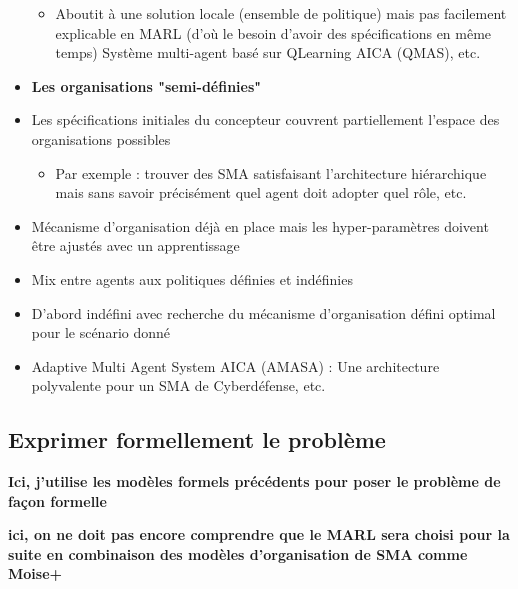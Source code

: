 \begin{itemize}
\begin{itemize}
              \item Aboutit à une solution locale (ensemble de politique) mais pas facilement explicable en MARL (d'où le besoin d'avoir des spécifications en même temps)
                    Système multi-agent basé sur QLearning AICA (QMAS), etc.
          \end{itemize}
    \item \textbf{Les organisations "semi-définies"}
    \item Les spécifications initiales du concepteur couvrent partiellement l'espace des organisations possibles
          \begin{itemize}
              \item Par exemple : trouver des SMA satisfaisant l'architecture hiérarchique mais sans savoir précisément quel agent doit adopter quel rôle, etc.
          \end{itemize}
    \item Mécanisme d'organisation déjà en place mais les hyper-paramètres doivent être ajustés avec un apprentissage
    \item Mix entre agents aux politiques définies et indéfinies
    \item D'abord indéfini avec recherche du mécanisme d'organisation défini optimal pour le scénario donné
    \item Adaptive Multi Agent System AICA (AMASA) : Une architecture polyvalente pour un SMA de Cyberdéfense, etc.
\end{itemize}

\subsection{Exprimer formellement le problème}
\textbf{Ici, j'utilise les modèles formels précédents pour poser le problème de façon formelle}

\textbf{ici, on ne doit pas encore comprendre que le MARL sera choisi pour la suite en combinaison des modèles d'organisation de SMA comme Moise+}

